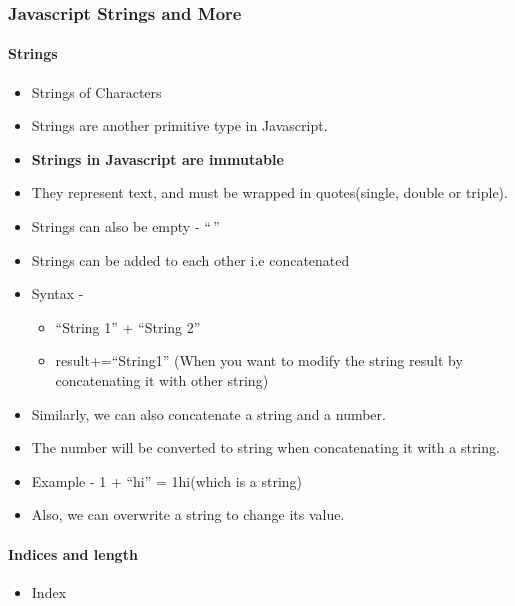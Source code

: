 \documentclass[
  paper=a4,
  ,captions=tableheading
]{scrartcl}
\providecommand{\tightlist}{%
  \setlength{\itemsep}{0pt}\setlength{\parskip}{0pt}}
\begin{document}
\hypertarget{javascript-strings-and-more}{%
\subsubsection{Javascript Strings and
More}\label{javascript-strings-and-more}}

\hypertarget{strings}{%
\paragraph{Strings}\label{strings}}

\begin{itemize}
\tightlist
\item
  Strings of Characters
\item
  Strings are another primitive type in Javascript.
\item
  \textbf{Strings in Javascript are immutable}
\item
  They represent text, and must be wrapped in quotes(single, double or
  triple).
\item
  Strings can also be empty - ``\,''
\item
  Strings can be added to each other i.e concatenated
\item
  Syntax -

  \begin{itemize}
  \tightlist
  \item
    ``String 1'' + ``String 2''
  \item
    result+=``String1'' (When you want to modify the string result by
    concatenating it with other string)
  \end{itemize}
\item
  Similarly, we can also concatenate a string and a number.
\item
  The number will be converted to string when concatenating it with a
  string.
\item
  Example - 1 + ``hi'' = 1hi(which is a string)
\item
  Also, we can overwrite a string to change its value.
\end{itemize}

\hypertarget{indices-and-length}{%
\paragraph{Indices and length}\label{indices-and-length}}

\begin{itemize}
\tightlist
\item
  Index
\end{itemize}
\end{document}
